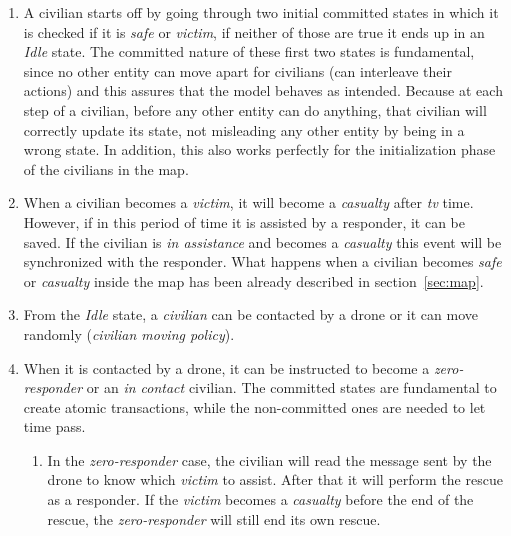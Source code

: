 \begin{enumerate}
	\item A civilian starts off by going through two initial committed states in which it is checked if it is \textit{safe} or \textit{victim}, if neither of those are true it ends up in an \textit{Idle} state. The committed nature of these first two states is fundamental, since no other entity can move apart for civilians (can interleave their actions) and this assures that the model behaves as intended. Because at each step of a civilian, before any other entity can do anything, that civilian will correctly update its state, not misleading any other entity by being in a wrong state. In addition, this also works perfectly for the initialization phase of the civilians in the map.
	
	\item When a civilian becomes a \textit{victim}, it will become a \textit{casualty} after \textit{tv} time. However, if in this period of time it is assisted by a responder, it can be saved. If the civilian is \textit{in assistance} and becomes a \textit{casualty} this event will be synchronized with the responder.\newline
	What happens when a civilian becomes \textit{safe} or \textit{casualty} inside the map has been already described in section~\ref{sec:map}.
	
	\item From the \textit{Idle} state, a \textit{civilian} can be contacted by a drone or it can move randomly (\textit{civilian moving policy}).
	
	\item When it is contacted by a drone, it can be instructed to become a \textit{zero-responder} or an \textit{in contact} civilian. The committed states are fundamental to create atomic transactions, while the non-committed ones are needed to let time pass.
	
	\begin{enumerate}
		\item In the \textit{zero-responder} case, the civilian will read the message sent by the drone to know which \textit{victim} to assist. After that it will perform the rescue as a responder. If the \textit{victim} becomes a \textit{casualty} before the end of the rescue, the \textit{zero-responder} will still end its own rescue.
		

\end{enumerate}
\end{enumerate}
